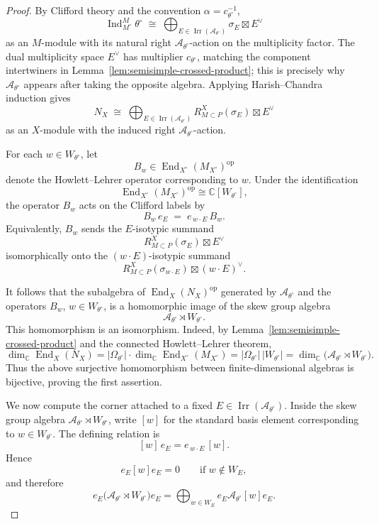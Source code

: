 \documentclass{amsart}
\theoremstyle{plain}
\numberwithin{equation}{section}
\theoremstyle{definition}
\renewcommand{\dim}{\operatorname{dim}}
\newcommand{\op}{\operatorname{op}}
\newcommand{\Ind}{\operatorname{Ind}}
\newcommand{\End}{\operatorname{End}}
\newcommand{\Irr}{\operatorname{Irr}}
\newcommand{\cA}{\mathcal{A}}
\newcommand{\C}{\mathbb{C}}
\begin{document}
\begin{proof}
By Clifford theory and the convention \(\alpha=c_{\theta^\circ}^{-1}\),
\[
\Ind_{M^\circ}^{M}\theta^\circ
\;\cong\;
\bigoplus_{E\in \Irr(\cA_{\theta^\circ})}
\sigma_E\boxtimes E^\vee
\]
as an \(M\)-module with its natural right
\(\cA_{\theta^\circ}\)-action on the multiplicity factor.  The dual
multiplicity space \(E^\vee\) has multiplier \(c_{\theta^\circ}\), matching the
component intertwiners in Lemma~\ref{lem:semisimple-crossed-product}; this is
precisely why \(\cA_{\theta^\circ}\) appears after taking the opposite algebra.
Applying Harish--Chandra induction gives
\[
N_X
\;\cong\;
\bigoplus_{E\in \Irr(\cA_{\theta^\circ})}
R^X_{M\subset P}(\sigma_E)\boxtimes E^\vee
\]
as an \(X\)-module with the induced right \(\cA_{\theta^\circ}\)-action.

For each \(w\in W_{\theta^\circ}\), let
\[
B_w\in \End_{X^\circ}(M_{X^\circ})^{\op}
\]
denote the Howlett--Lehrer operator corresponding to \(w\).  Under the
identification
\[
\End_{X^\circ}(M_{X^\circ})^{\op}\cong \C[W_{\theta^\circ}],
\]
the operator \(B_w\) acts on the Clifford labels by
\[
B_w\, e_E \;=\; e_{\,w\cdot E}\, B_w.
\]
Equivalently, \(B_w\) sends the \(E\)-isotypic summand
\[
R^X_{M\subset P}(\sigma_E)\boxtimes E^\vee
\]
isomorphically onto the \((w\cdot E)\)-isotypic summand
\[
R^X_{M\subset P}(\sigma_{w\cdot E})\boxtimes (w\cdot E)^\vee.
\]

It follows that the subalgebra of \(\End_X(N_X)^{\op}\) generated by
\(\cA_{\theta^\circ}\) and the operators \(B_w\), \(w\in W_{\theta^\circ}\), is a
homomorphic image of the skew group algebra
\[
\cA_{\theta^\circ}\rtimes W_{\theta^\circ}.
\]
This homomorphism is an isomorphism.  Indeed, by
Lemma~\ref{lem:semisimple-crossed-product} and the connected
Howlett--Lehrer theorem,
\[
\dim_\C \End_X(N_X)
=
|\Omega_{\theta^\circ}|\cdot \dim_\C \End_{X^\circ}(M_{X^\circ})
=
|\Omega_{\theta^\circ}|\,|W_{\theta^\circ}|
=
\dim_\C\bigl(\cA_{\theta^\circ}\rtimes W_{\theta^\circ}\bigr).
\]
Thus the above surjective homomorphism between finite-dimensional algebras is
bijective, proving the first assertion.

We now compute the corner attached to a fixed
\(E\in \Irr(\cA_{\theta^\circ})\).  Inside the skew group algebra
\(\cA_{\theta^\circ}\rtimes W_{\theta^\circ}\), write \([w]\) for the standard
basis element corresponding to \(w\in W_{\theta^\circ}\).  The defining relation is
\[
[w]\, e_E = e_{\,w\cdot E}\,[w].
\]
Hence
\[
e_E [w] e_E=0
\qquad\text{if }w\notin W_E,
\]
and therefore
\[
e_E\bigl(\cA_{\theta^\circ}\rtimes W_{\theta^\circ}\bigr)e_E
=
\bigoplus_{w\in W_E} e_E\cA_{\theta^\circ}[w]e_E.
\]


\end{proof}
\end{document}
